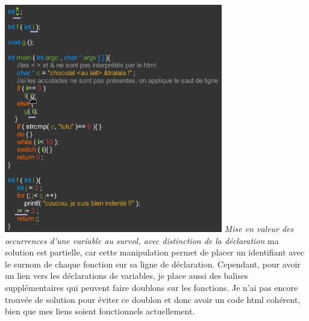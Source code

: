 \documentclass[10pt,a4paper]{report}
\begin{document}
	\includegraphics[height=10cm]{site/survol.png} 
	\newline
\textit{Mise en valeur des occurrences d'une variable au survol, avec distinction de la déclaration}
\newline 
ma solution est partielle, car cette manipulation permet de placer un identifiant avec le surnom de chaque fonction sur sa ligne de déclaration. Cependant, pour avoir un lien vers les déclarations de variables, je place aussi des balises supplémentaires qui peuvent faire doublons sur les fonctions. Je n'ai pas encore trouvée de solution pour éviter ce doublon et donc avoir un code html cohérent, bien que mes liens soient fonctionnels actuellement. \newline
\end{document}
